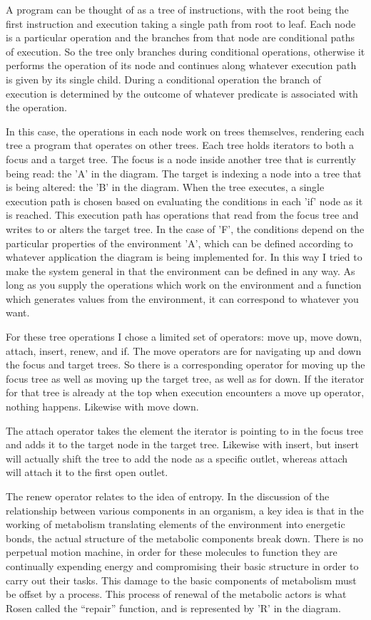 \documentclass[12pt]{article}
\begin{document}
A program can be thought of as a tree of instructions, with the root being the first instruction and execution taking a single path from root to leaf.  Each node is a particular operation and the branches from that node are conditional paths of execution.  So the tree only branches during conditional operations, otherwise it performs the operation of its node and continues along whatever execution path is given by its single child.  During a conditional operation the branch of execution is determined by the outcome of whatever predicate is associated with the operation.  

In this case, the operations in each node work on trees themselves, rendering each tree a program that operates on other trees.  Each tree holds iterators to both a focus and a target tree.  The focus is a node inside another tree that is currently being read: the 'A' in the diagram.   The target is indexing a node into a tree that is being altered: the 'B' in the diagram.  When the tree executes, a single execution path is chosen based on evaluating the conditions in each 'if' node as it is reached.  This execution path has operations that read from the focus tree and writes to or alters the target tree.  In the case of 'F', the conditions depend on the particular properties of the environment 'A', which can be defined according to whatever application the diagram is being implemented for.  In this way I tried to make the system general in that the environment can be defined in any way.  As long as you supply the operations which work on the environment and a function which generates values from the environment, it can correspond to whatever you want.  

For these tree operations I chose a limited set of operators: move up, move down, attach, insert, renew, and if.  The move operators are for navigating up and down the focus and target trees.  So there is a corresponding operator for moving up the focus tree as well as moving up the target tree, as well as for down.  If the iterator for that tree is already at the top when execution encounters a move up operator, nothing happens.  Likewise with move down.  

The attach operator takes the element the iterator is pointing to in the focus tree and adds it to the target node in the target tree.  Likewise with insert, but insert will actually shift the tree to add the node as a specific outlet, whereas attach will attach it to the first open outlet.  

The renew operator relates to the idea of entropy.  In the discussion of the relationship between various components in an organism, a key idea is that in the working of metabolism translating elements of the environment into energetic bonds, the actual structure of the metabolic components break down.  There is no perpetual motion machine, in order for these molecules to function they are continually expending energy and compromising their basic structure in order to carry out their tasks.  This damage to the basic components of metabolism must be offset by a process.  This process of renewal of the metabolic actors is what Rosen called the ``repair'' function, and is represented by 'R' in the diagram.  
\end{document}
